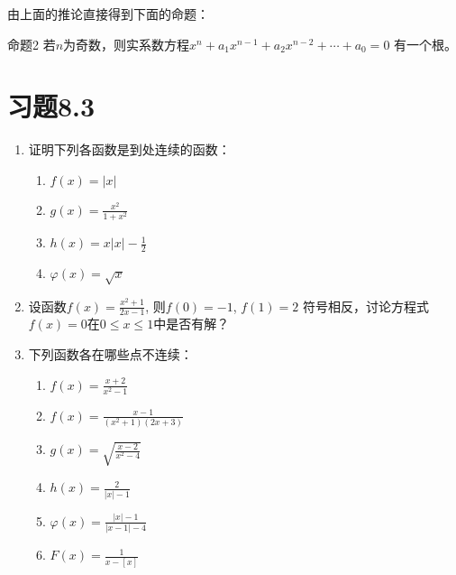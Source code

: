 由上面的推论直接得到下面的命题：
\begin{blk}{命题2}
    若$n$为奇数，则实系数方程$x^n+a_1x^{n-1}+a_2x^{n-2}+\cdots+a_0=0$
有一个根。 
\end{blk}

\section*{习题8.3}
\begin{enumerate}
    \item 证明下列各函数是到处连续的函数：
\begin{multicols}{2}
\begin{enumerate}
    \item $f(x)=|x|$
    \item $g(x)=\frac{x^2}{1+x^2}$
    \item $h(x)=x|x|-\frac{1}{2}$
    \item $\varphi(x)=\sqrt{x}$
\end{enumerate}
\end{multicols}

\item 设函数$f(x)=\frac{x^2+1}{2x-1}$, 
则$f(0)=-1$, $f(1)=2$
符号相反，讨论方程式$f(x)=0$在$0\le x\le 1$中是否有解？
\item 下列函数各在哪些点不连续：
\begin{multicols}{2}
\begin{enumerate}
    \item $f(x)=\frac{x+2}{x^2-1}$
    \item $f(x)=\frac{x-1}{(x^2+1)(2x+3)}$
    \item $g(x)=\sqrt{\frac{x-2}{x^2-4}}$
    \item $h(x)=\frac{2}{|x|-1}$
    \item $\varphi(x)=\frac{|x|-1}{|x-1|-4}$
    \item $F(x)=\frac{1}{x-[x]}$
\end{enumerate}
\end{multicols}


\end{enumerate}
